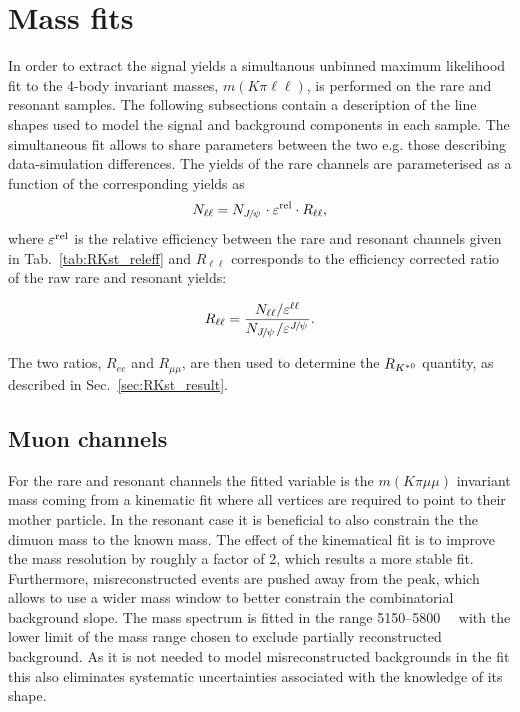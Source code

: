 \chapter{Mass fits}
\label{sec:rkst_fits}

In order to extract the signal yields a simultanous unbinned maximum likelihood fit
to the 4-body invariant masses, $m(K\pi\ell\ell)$, is performed on the rare and resonant samples.
The following subsections contain a description of the line shapes used to model
the signal and background components in each sample.
The simultaneous fit allows to share parameters between the two e.g. those describing data-simulation differences.
The yields of the rare channels are parameterised as a function of the corresponding \jpsi yields as
%
\begin{equation}
N_{\ell\ell} = N_{\jpsi} \cdot \varepsilon^{\rm rel} \cdot R_{\ell\ell},
\end{equation}
%
where $\varepsilon^{\rm rel}$ is the relative efficiency between the rare and resonant channels
given in Tab.~\ref{tab:RKst_releff} and
$R_{\ell\ell}$ corresponds to the efficiency corrected ratio of the raw rare and resonant yields:

\begin{equation}
R_{\ell\ell} = \frac{N_{\ell\ell} / \varepsilon^{\ell\ell}}{N_{\jpsi} / \varepsilon^{\jpsi}}.
\end{equation}

The two ratios, $R_{ee}$ and $R_{\mu\mu}$, are then used to determine
the $R_{{{K}^{*0}}}$ quantity, as described in Sec.~\ref{sec:RKst_result}.


\section{Muon channels}

For the rare and resonant \mumu channels the fitted variable is the $m(K\pi \mu\mu)$ invariant mass coming
from a kinematic fit where all vertices are required to point to their mother particle.
In the resonant case it is beneficial to also constrain the the dimuon mass to the known \jpsi mass.
The effect of the kinematical fit is to improve the mass resolution by roughly a factor of 2, which results
a more stable fit. Furthermore, misreconstructed events are pushed away from the \Bz peak, which allows to
use a wider mass window to better constrain the combinatorial background slope.
The mass spectrum is fitted in the range 5150--5800~\mevcc~ with the lower limit
of the mass range chosen to exclude partially reconstructed background.
As it is not needed to model misreconstructed backgrounds in the fit this also
eliminates systematic uncertainties associated with the knowledge of its shape. 

